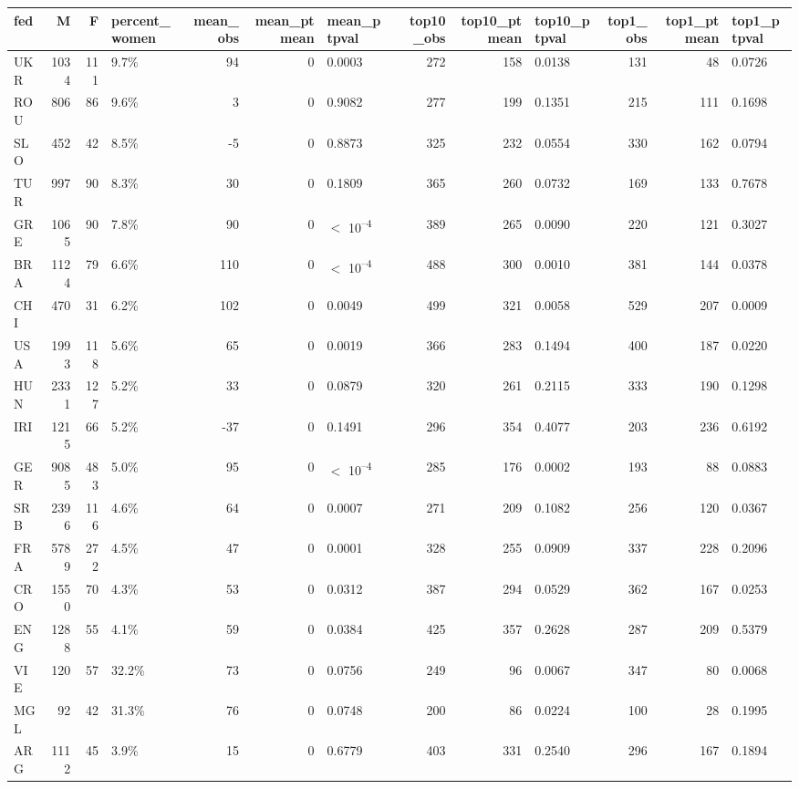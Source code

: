 
\begin{tabular}[t]{lrrlrrlrrlrrl}
\toprule
fed & M & F & percent_women & mean_obs & mean_ptmean & mean_ptpval & top10_obs & top10_ptmean & top10_ptpval & top1_obs & top1_ptmean & top1_ptpval\\
\midrule
UKR & 1034 & 111 & 9.7\% & 94 & 0 & 0.0003 & 272 & 158 & 0.0138 & 131 & 48 & 0.0726\\
ROU & 806 & 86 & 9.6\% & 3 & 0 & 0.9082 & 277 & 199 & 0.1351 & 215 & 111 & 0.1698\\
SLO & 452 & 42 & 8.5\% & -5 & 0 & 0.8873 & 325 & 232 & 0.0554 & 330 & 162 & 0.0794\\
TUR & 997 & 90 & 8.3\% & 30 & 0 & 0.1809 & 365 & 260 & 0.0732 & 169 & 133 & 0.7678\\
GRE & 1065 & 90 & 7.8\% & 90 & 0 & $<$ 10\textsuperscript{--4} & 389 & 265 & 0.0090 & 220 & 121 & 0.3027\\
BRA & 1124 & 79 & 6.6\% & 110 & 0 & $<$ 10\textsuperscript{--4} & 488 & 300 & 0.0010 & 381 & 144 & 0.0378\\
CHI & 470 & 31 & 6.2\% & 102 & 0 & 0.0049 & 499 & 321 & 0.0058 & 529 & 207 & 0.0009\\
USA & 1993 & 118 & 5.6\% & 65 & 0 & 0.0019 & 366 & 283 & 0.1494 & 400 & 187 & 0.0220\\
HUN & 2331 & 127 & 5.2\% & 33 & 0 & 0.0879 & 320 & 261 & 0.2115 & 333 & 190 & 0.1298\\
IRI & 1215 & 66 & 5.2\% & -37 & 0 & 0.1491 & 296 & 354 & 0.4077 & 203 & 236 & 0.6192\\
GER & 9085 & 483 & 5.0\% & 95 & 0 & $<$ 10\textsuperscript{--4} & 285 & 176 & 0.0002 & 193 & 88 & 0.0883\\
SRB & 2396 & 116 & 4.6\% & 64 & 0 & 0.0007 & 271 & 209 & 0.1082 & 256 & 120 & 0.0367\\
FRA & 5789 & 272 & 4.5\% & 47 & 0 & 0.0001 & 328 & 255 & 0.0909 & 337 & 228 & 0.2096\\
CRO & 1550 & 70 & 4.3\% & 53 & 0 & 0.0312 & 387 & 294 & 0.0529 & 362 & 167 & 0.0253\\
ENG & 1288 & 55 & 4.1\% & 59 & 0 & 0.0384 & 425 & 357 & 0.2628 & 287 & 209 & 0.5379\\
VIE & 120 & 57 & 32.2\% & 73 & 0 & 0.0756 & 249 & 96 & 0.0067 & 347 & 80 & 0.0068\\
MGL & 92 & 42 & 31.3\% & 76 & 0 & 0.0748 & 200 & 86 & 0.0224 & 100 & 28 & 0.1995\\
ARG & 1112 & 45 & 3.9\% & 15 & 0 & 0.6779 & 403 & 331 & 0.2540 & 296 & 167 & 0.1894\\

\end{tabular}
